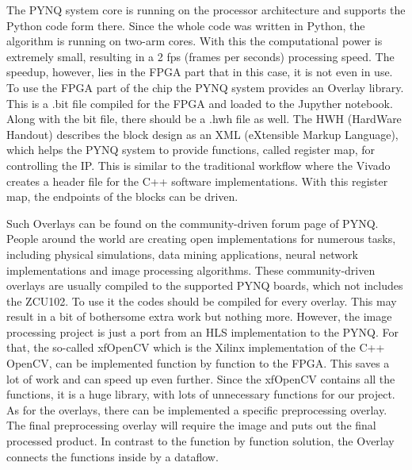 The PYNQ system core is running on the processor architecture and supports the Python code form there.
Since the whole code was written in Python, the algorithm is running on two-arm cores.
With this the computational power is extremely small, resulting in a 2 fps (frames per seconds) processing speed.
The speedup, however, lies in the FPGA part that in this case, it is not even in use.
To use the FPGA part of the chip the PYNQ system provides an Overlay library.
This is a .bit file compiled for the FPGA and loaded to the Jupyther notebook.
Along with the bit file, there should be a .hwh file as well.
The HWH (HardWare Handout) describes the block design as an XML (eXtensible Markup Language), which helps the PYNQ system to provide functions, called register map, for controlling the IP.
This is similar to the traditional workflow where the Vivado creates a header file for the C++ software implementations.
With this register map, the endpoints of the blocks can be driven.

Such Overlays can be found on the community-driven forum page of PYNQ.
People around the world are creating open implementations for numerous tasks, including physical simulations, data mining applications, neural network implementations and image processing algorithms.
These community-driven overlays are usually compiled to the supported PYNQ boards, which not includes the ZCU102.
To use it the codes should be compiled for every overlay.
This may result in a bit of bothersome extra work but nothing more.
However, the image processing project is just a port from an HLS implementation to the PYNQ.
For that, the so-called xfOpenCV which is the Xilinx implementation of the C++ OpenCV, can be implemented function by function to the FPGA.
This saves a lot of work and can speed up even further.
Since the xfOpenCV contains all the functions, it is a huge library, with lots of unnecessary functions for our project.
As for the overlays, there can be implemented a specific preprocessing overlay.
The final preprocessing overlay will require the image and puts out the final processed product.
In contrast to the function by function solution, the Overlay connects the functions inside by a dataflow.

